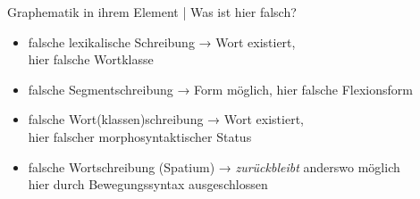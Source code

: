 \begin{frame}
  {Graphematik in ihrem Element | Was ist hier falsch?}
  \onslide<+->
  \onslide<+-> 
  \begin{exe}
    \ex\label{ex:graphematikalsteildergrammatik001}
    \begin{xlist}
      \onslide<+->
      \onslide<+->
      \onslide<+->
    \end{xlist}
  \end{exe}
  \begin{itemize}[<+->]
    \item falsche lexikalische Schreibung → Wort existiert,\\
      \alert{hier falsche Wortklasse}
    \item falsche Segmentschreibung → Form möglich, \alert{hier falsche Flexionsform}
    \item falsche Wort(klassen)schreibung → Wort existiert,\\
      \alert{hier falscher morphosyntaktischer Status}
    \item falsche Wortschreibung (Spatium) → \textit{zurückbleibt} anderswo möglich\\
      \alert{hier durch Bewegungssyntax ausgeschlossen}
  \end{itemize}
\end{frame}

